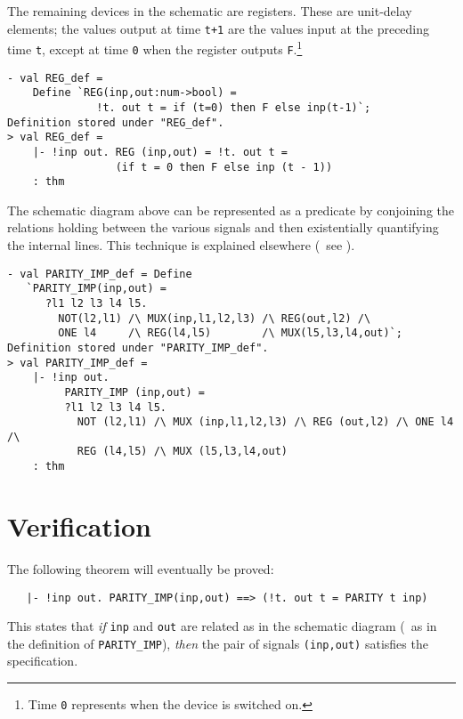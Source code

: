 The remaining devices in the schematic are registers.  These are
unit-delay elements; the values output at time {\small\verb|t+1|} are
the values input at the preceding time {\small\verb|t|}, except at
time {\small\verb|0|} when the register outputs
{\small\verb|F|}.\footnote{Time {\tt {\small 0}} represents when the
  device is switched on.}

\begin{session}
\begin{verbatim}
- val REG_def =
    Define `REG(inp,out:num->bool) =
              !t. out t = if (t=0) then F else inp(t-1)`;
Definition stored under "REG_def".
> val REG_def =
    |- !inp out. REG (inp,out) = !t. out t =
                 (if t = 0 then F else inp (t - 1))
    : thm
\end{verbatim}
\end{session}

The schematic diagram above can be represented as a predicate by
conjoining the relations holding between the various
signals and then existentially quantifying the internal lines.
This technique is explained elsewhere
(\eg\ see \cite{Camilleri-et-al,Why-HOL-paper}).

\begin{session}
\begin{verbatim}
- val PARITY_IMP_def = Define
   `PARITY_IMP(inp,out) =
      ?l1 l2 l3 l4 l5.
        NOT(l2,l1) /\ MUX(inp,l1,l2,l3) /\ REG(out,l2) /\
        ONE l4     /\ REG(l4,l5)        /\ MUX(l5,l3,l4,out)`;
Definition stored under "PARITY_IMP_def".
> val PARITY_IMP_def =
    |- !inp out.
         PARITY_IMP (inp,out) =
         ?l1 l2 l3 l4 l5.
           NOT (l2,l1) /\ MUX (inp,l1,l2,l3) /\ REG (out,l2) /\ ONE l4 /\
           REG (l4,l5) /\ MUX (l5,l3,l4,out)
    : thm
\end{verbatim}
\end{session}\label{parity-imp}

\section{Verification}

The following theorem will eventually be proved:
{\small\begin{verbatim}
   |- !inp out. PARITY_IMP(inp,out) ==> (!t. out t = PARITY t inp)
\end{verbatim}}
This states that {\it if\/} {\small\verb|inp|} and {\small\verb|out|}
are related as in the schematic
diagram (\ie\ as in the definition of {\small\verb|PARITY_IMP|}),
{\it then\/} the
pair of signals {\small\verb|(inp,out)|} satisfies the specification.

